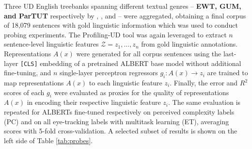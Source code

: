 \documentclass[a4paper, nobind]{templates/ociamthesis}
\begin{document}
Three UD English treebanks spanning different textual genres -- \textbf{EWT, GUM, and ParTUT} respectively by \textcite{silveira-etal-2014-gold}, \textcite{zeldes-2017-gum}, and \textcite{sanguinetti-etal-2015-partut} -- were aggregated, obtaining a final corpus of 18,079 sentences with gold linguistic information which was used to conduct probing experiments. The Profiling-UD tool was again leveraged to extract \(n\) sentence-level linguistic features \(\mathcal{Z}=z_1, \dots, z_n\) from gold linguistic annotations. Representations \(A(x)\) were generated for all corpus sentences using the last-layer \texttt{{[}CLS{]}} embedding of a pretrained ALBERT base model without additional fine-tuning, and \(n\) single-layer perceptron regressors \(g_i: A(x) \rightarrow z_i\) are trained to map representations \(A(x)\) to each linguistic feature \(z_i\). Finally, the error and \(R^2\) scores of each \(g_i\) were evaluated as proxies for the quality of representations \(A(x)\) in encoding their respective linguistic feature \(z_i\). The same evaluation is repeated for ALBERTs fine-tuned respectively on perceived complexity labels (PC) and on all eye-tracking labels with multitask learning (ET), averaging scores with 5-fold cross-validation. A selected subset of results is shown on the left side of Table \ref{tab:probes}.
\end{document}
